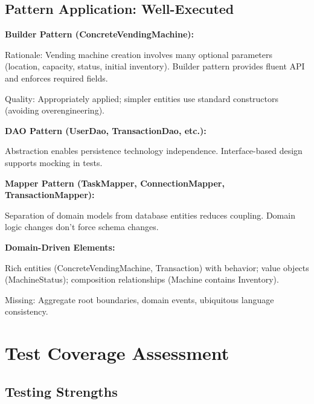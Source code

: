\documentclass[11pt,a4paper]{article}
\begin{document}
\subsection{Pattern Application: Well-Executed}

\begin{tcolorbox}[colback=strengthgreen!5,colframe=strengthgreen,title=\textbf{Design Patterns: Strategic Use}]
\textbf{Builder Pattern (ConcreteVendingMachine):}

Rationale: Vending machine creation involves many optional parameters (location, capacity, status, initial inventory). Builder pattern provides fluent API and enforces required fields.

Quality: Appropriately applied; simpler entities use standard constructors (avoiding overengineering).

\textbf{DAO Pattern (UserDao, TransactionDao, etc.):}

Abstraction enables persistence technology independence. Interface-based design supports mocking in tests.

\textbf{Mapper Pattern (TaskMapper, ConnectionMapper, TransactionMapper):}

Separation of domain models from database entities reduces coupling. Domain logic changes don't force schema changes.

\textbf{Domain-Driven Elements:}

Rich entities (ConcreteVendingMachine, Transaction) with behavior; value objects (MachineStatus); composition relationships (Machine contains Inventory).

Missing: Aggregate root boundaries, domain events, ubiquitous language consistency.
\end{tcolorbox}

\section{Test Coverage Assessment}

\subsection{Testing Strengths}
\end{document}
